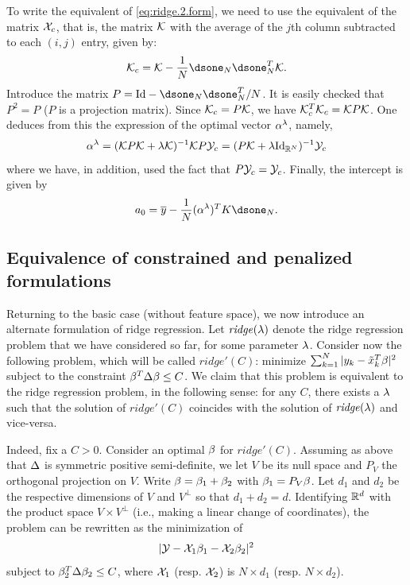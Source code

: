 
To write the equivalent of \cref{eq:ridge.2.form}, we need to use the equivalent of the matrix ${\mathcal X}_c$, that is, the matrix ${\mathcal K}$ with the average of the $j$th column subtracted to each $(i,j)$ entry, given by: 
\[
\CK_c = \CK - \frac1N \dsone_N\dsone_N^T\CK.
\]
Introduce the matrix $P = \Id - \dsone_N\dsone_N^T/N$. It is easily checked that $P^2=P$ ($P$ is a projection matrix). Since ${\mathcal K}_c = P{\mathcal K} $, we have ${\mathcal K}_c^T{\mathcal K}_c = {\mathcal K} P{\mathcal K}$. One deduces from this the expression of the optimal vector $\alpha^\lambda$, namely,
\[
\al^\la = (\CK P\CK + \la\CK)^{-1}\CK P \CY_c = (P\CK +\la \Id[N])^{-1} \CY_c
\]
where we have, in addition, used the fact that $P{\mathcal Y}_c = {\mathcal Y}_c$. Finally, the intercept is given by
\[
{a_0} = \by - \frac1N (\al^\la)^T K\dsone_N.
\] 



\subsection{Equivalence of constrained and penalized formulations}
 
 Returning to the basic case (without feature space), we now introduce an alternate formulation
of ridge regression. Let $\mathit{ridge}(\lambda)$ denote
the ridge regression problem that we have considered so far, for some parameter $\lambda$. Consider now the
following problem, which will be called $\mathit{ridge}'(C)$:
minimize $\sum_{k=1}^N |y_k - {\tilde{x}}_k^T\beta|^2$ subject to the constraint
$\beta^T\Delta\beta \leq C$. We claim that this problem is
equivalent to the ridge regression problem, in the following sense:
for any $C$, there exists a $\lambda$ such that the solution of
$\mathit{ridge}'(C)$ coincides with the solution of
$\mathit{ridge}(\lambda)$ and vice-versa. \bigskip

Indeed, fix a $C>0$. Consider an optimal $\beta$ for $\mathit{ridge}'(C)$. Assuming as above that $\Delta$ is symmetric positive semi-definite, we let $V$ be its null space and $P_V$ the orthogonal projection on $V$. Write $\beta = \beta_1 + \beta_2$ with $\beta_1 = P_V\beta$. Let $d_1$ and $d_2$ be the respective dimensions of $V$ and $V^\perp$ so that $d_1+d_2 = d$. Identifying ${\mathbb{R}}^d$ with the product space $V \times V^\perp$ (i.e., making a linear change of coordinates), the problem can be rewritten as the minimization of 
\[
|{\mathcal Y} - {\mathcal X}_1 \beta_1 - {\mathcal X}_2 \beta_2|^2
\]
subject to $\beta_2^T \Delta\beta_2 \leq C$, where ${\mathcal X}_1$ (resp. ${\mathcal X}_2$) is $N\times d_1$ (resp. $N\times d_2$).

